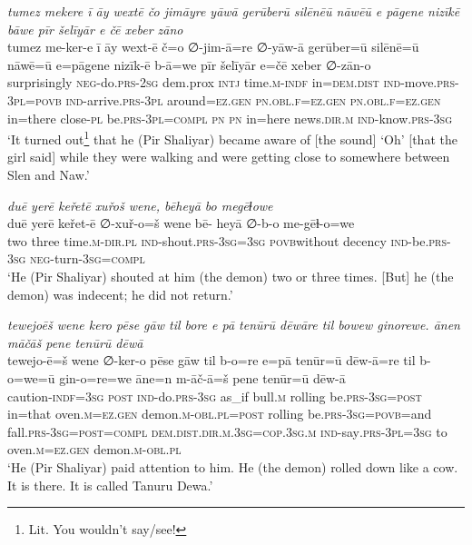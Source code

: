 \ea \label{ŽP.175}
\textit{tumez mekere ī āy wextē čo jimāyre yāwā gerūberū silēnēū nāwēū e pāgene nizīkē bāwe pīr šelīyār e čē xeber zāno} \\ 
\gll tumez me-ker-e ī āy wext-ē č=o ∅-jim-ā=re ∅-yāw-ā gerūber=ū silēnē=ū nāwē=ū e=pāgene nizīk-ē b-ā=we pīr šelīyār e=čē xeber ∅-zān-o \\ 
 surprisingly \textsc{neg-}do\textsc{.prs}-\textsc{2sg} dem.prox \textsc{intj} time\textsc{.m}\textsc{-indf} in=\textsc{dem.dist} \textsc{ind-}move\textsc{.prs}\textsc{-3pl}\textsc{=\textsc{povb}} \textsc{ind-}arrive\textsc{.prs}\textsc{-3pl} around\textsc{\textsc{=ez.gen}} \textsc{pn}\textsc{.obl}\textsc{.f}\textsc{\textsc{=ez.gen}} \textsc{pn}\textsc{.obl}\textsc{.f}\textsc{\textsc{=ez.gen}} in=there close\textsc{\textsc{-pl}} be\textsc{.prs}\textsc{-3pl}\textsc{=compl} \textsc{pn} \textsc{pn} in=here news\textsc{.dir}\textsc{.m} \textsc{ind-}know\textsc{.prs}\textsc{-3sg} \\ 
\glt `It turned out\footnote{Lit. You wouldn’t say/see!} that he (Pir Shaliyar) became aware of [the sound] ‘Oh’ [that the girl said] while they were walking and were getting close to somewhere between Slen and Naw.'
\z 
 
\ea \label{ŽP.194}
\textit{duē yerē keřetē xuřoš wene, bēheyā bo megēɫowe} \\ 
\gll duē yerē keřet-ē ∅-xuř-o=š wene bē- heyā ∅-b-o me-gēɫ-o=we \\ 
 two three time\textsc{.m}\textsc{-dir}\textsc{.pl} \textsc{ind-}shout\textsc{.prs}\textsc{-3sg}\textsc{=3sg} \textsc{povb}without decency \textsc{ind-}be\textsc{.prs}\textsc{-3sg} \textsc{neg-}turn\textsc{-3sg}\textsc{=compl} \\ 
\glt `He (Pir Shaliyar) shouted at him (the demon) two or three times. [But] he (the demon) was indecent; he did not return.'
\z 
 
\ea \label{ŽP.200}
\textit{tewejoēš wene kero pēse gāw til bore e pā tenūrū dēwāre til bowew ginorewe. ānen māčāš pene tenūrū dēwā} \\ 
\gll tewejo-ē=š wene ∅-ker-o pēse gāw til b-o=re e=pā tenūr=ū dēw-ā=re til b-o=we=ū gin-o=re=we āne=n m-āč-ā=š pene tenūr=ū dēw-ā \\ 
 caution\textsc{-indf}\textsc{=3sg} \textsc{post} \textsc{ind-}do\textsc{.prs}\textsc{-3sg} as\_if bull\textsc{.m} rolling be\textsc{.prs}\textsc{-3sg}\textsc{=\textsc{post}} in=that oven\textsc{.m}\textsc{\textsc{=ez.gen}} demon\textsc{.m}\textsc{-obl}\textsc{.pl}\textsc{=\textsc{post}} rolling be\textsc{.prs}\textsc{-3sg}\textsc{=\textsc{povb}}=and fall\textsc{.prs}\textsc{-3sg}\textsc{=\textsc{post}}\textsc{=compl} \textsc{dem.dist}\textsc{.dir}\textsc{.m}\textsc{.3sg}\textsc{=cop}\textsc{.3sg}\textsc{.m} \textsc{ind-}say\textsc{.prs}\textsc{-3pl}\textsc{=3sg} to oven\textsc{.m}\textsc{\textsc{=ez.gen}} demon\textsc{.m}\textsc{-obl}\textsc{.pl} \\ 
\glt `He (Pir Shaliyar) paid attention to him. He (the demon) rolled down like a cow. It is there. It is called Tanuru Dewa.'
\z 
 
